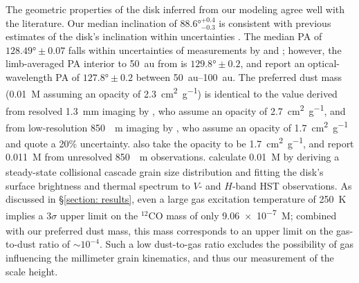 \documentclass[modern]{aastex62}
\begin{document}
The geometric properties of the disk inferred from our modeling agree well with the literature. 
Our median inclination of $\ang[angle-symbol-over-decimal]{88.6}^{+0.4}_{-0.3}$ is consistent with previous estimates of the disk's inclination within uncertainties \citep{metchev05,krist05}.
The median PA of $\ang[angle-symbol-over-decimal]{128.49} \pm 0.07$ falls within uncertainties of measurements by \cite{macgregor13} and \cite{krist05}; however, the limb-averaged PA interior to \SI{50}{au} from \cite{metchev05} is $\ang[angle-symbol-over-decimal]{129.8} \pm 0.2$, and \cite{schneider14} report an optical-wavelength PA of $\ang[angle-symbol-over-decimal]{127.8} \pm 0.2$ between \SIrange{50}{100}{au}.
The preferred dust mass (\SI{0.01}{M_\earth} assuming an opacity of \SI{2.3}{cm^2.g^{-1}}) is identical to the value derived from resolved \SI{1.3}{mm} imaging by \cite{macgregor13}, who assume an opacity of \SI{2.7}{cm^2.g^{-1}}, and from low-resolution \SI{850}{\mu m} imaging by \cite{matthews15}, who assume an opacity of \SI{1.7}{cm^2.g^{-1}} and quote a 20\% uncertainty.
\cite{liu04} also take the opacity to be \SI{1.7}{cm^2.g^{-1}}, and report \SI{0.011}{M_\earth} from unresolved \SI{850}{\mu m} observations.
\cite{strubbe&chiang06} calculate \SI{0.01}{M_\earth} by deriving a steady-state collisional cascade grain size distribution and fitting the disk's surface brightness and thermal spectrum to $V$- and $H$-band HST observations.
As discussed in \S \ref{section: results}, even a large gas excitation temperature of \SI{250}{K} implies a $3 \sigma$ upper limit on the $^{12}$CO mass of only \SI{9.06e-7}{M_\earth}; combined with our preferred dust mass, this mass corresponds to an upper limit on the gas-to-dust ratio of $\sim 10^{-4}$.
Such a low dust-to-gas ratio excludes the possibility of gas influencing the millimeter grain kinematics, and thus our measurement of the scale height.
\end{document}
